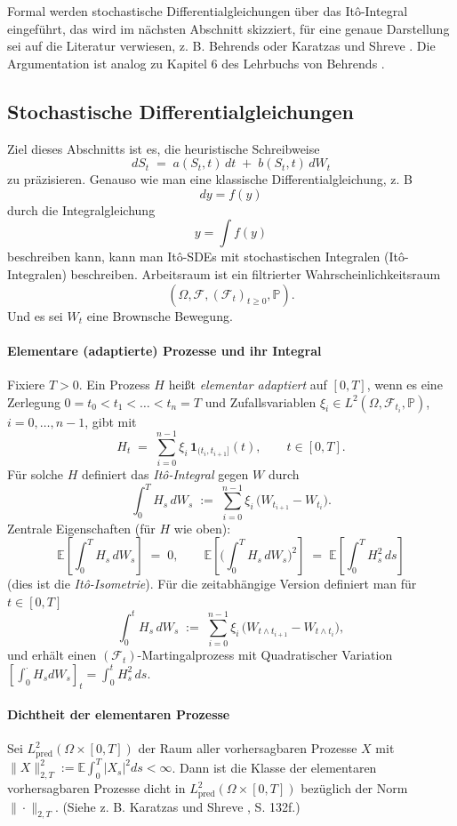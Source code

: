 Formal werden stochastische Differentialgleichungen über das It\^o-Integral eingeführt, das wird 
im nächsten Abschnitt skizziert, für eine genaue Darstellung sei auf die Literatur verwiesen, z. B. Behrends \cite{behrends} oder Karatzas und Shreve \cite{karatzas_brownian_1991}.
Die Argumentation ist analog zu Kapitel 6 des Lehrbuchs von Behrends \cite{behrends}.

\subsection{Stochastische Differentialgleichungen}
Ziel dieses Abschnitts ist es, die heuristische Schreibweise
$$
dS_t \;=\; a(S_t,t)\,dt \;+\; b(S_t,t)\,dW_t
$$
zu präzisieren. Genauso wie man eine klassische Differentialgleichung, z. B
$$dy = f(y)$$
durch die Integralgleichung
$$y = \int f(y)$$
beschreiben kann, kann man It\^o-SDEs mit stochastischen Integralen (It\^o-Integralen) beschreiben.
Arbeitsraum ist ein filtrierter Wahrscheinlichkeitsraum
$$
(\Omega,\mathcal F,(\mathcal F_t)_{t\ge 0},\mathbb P).
$$
Und es sei $W_t$ eine Brownsche Bewegung.

\paragraph{Elementare (adaptierte) Prozesse und ihr Integral}
Fixiere $T>0$. Ein Prozess $H$ heißt \emph{elementar adaptiert} auf $[0,T]$, wenn es eine Zerlegung $0=t_0<t_1<\dots<t_n=T$ und Zufallsvariablen $\xi_i\in L^2(\Omega,\mathcal F_{t_i},\mathbb P)$, $i=0,\dots,n-1$, gibt mit
$$
H_t \;=\; \sum_{i=0}^{n-1} \xi_i\,\mathbf 1_{(t_i,t_{i+1}]}(t),\qquad t\in[0,T].
$$
Für solche $H$ definiert das \emph{It\^o-Integral} gegen $W$ durch
$$
\int_0^T H_s\,dW_s \;:=\; \sum_{i=0}^{n-1} \xi_i\,\big(W_{t_{i+1}}-W_{t_i}\big).
$$
Zentrale Eigenschaften (für $H$ wie oben):
$$
\mathbb E\!\left[\int_0^T H_s\,dW_s\right] \;=\; 0,\qquad
\mathbb E\!\left[\Big(\int_0^T H_s\,dW_s\Big)^{\!2}\right] \;=\; \mathbb E\!\left[\int_0^T H_s^2\,ds\right]
$$
(dies ist die \emph{It\^o-Isometrie}). Für die zeitabhängige Version definiert man für $t\in[0,T]$
$$
\int_0^t H_s\,dW_s \;:=\; \sum_{i=0}^{n-1} \xi_i\,\big(W_{t\wedge t_{i+1}}-W_{t\wedge t_i}\big),
$$
und erhält einen $(\mathcal F_t)$-Martingalprozess mit Quadratischer Variation
$[\!\int_0^\cdot H_s dW_s]_t = \int_0^t H_s^2\,ds$.

\paragraph{Dichtheit der elementaren Prozesse}
Sei $L^2_{\mathrm{pred}}(\Omega\times[0,T])$ der Raum aller vorhersagbaren Prozesse $X$ mit
$\|X\|_{2,T}^2 := \mathbb E\!\int_0^T |X_s|^2 ds <\infty$.
Dann ist die Klasse der elementaren vorhersagbaren Prozesse dicht in $L^2_{\mathrm{pred}}(\Omega\times[0,T])$ bezüglich der Norm $\|\cdot\|_{2,T}$. (Siehe z. B. Karatzas und Shreve \cite{karatzas_brownian_1991}, S. 132f.)
